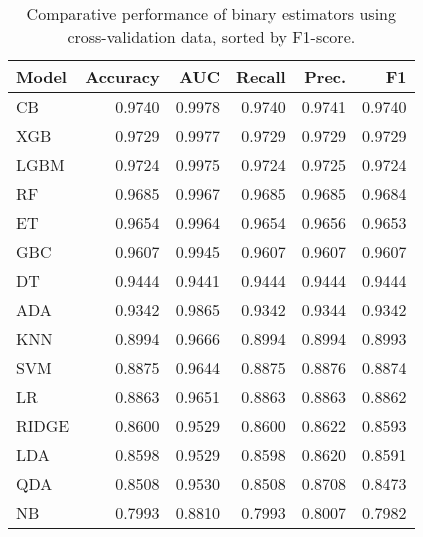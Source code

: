 \begin{table}
\caption{Comparative performance of binary estimators using cross-validation data, sorted by F1-score.}
\label{tbl:binary_cv_res_compare_models_df}
\begin{tabular}{lrrrrr}
\toprule
Model & Accuracy & AUC & Recall & Prec. & F1 \\
\midrule
CB & 0.9740 & 0.9978 & 0.9740 & 0.9741 & 0.9740 \\
XGB & 0.9729 & 0.9977 & 0.9729 & 0.9729 & 0.9729 \\
LGBM & 0.9724 & 0.9975 & 0.9724 & 0.9725 & 0.9724 \\
RF & 0.9685 & 0.9967 & 0.9685 & 0.9685 & 0.9684 \\
ET & 0.9654 & 0.9964 & 0.9654 & 0.9656 & 0.9653 \\
GBC & 0.9607 & 0.9945 & 0.9607 & 0.9607 & 0.9607 \\
DT & 0.9444 & 0.9441 & 0.9444 & 0.9444 & 0.9444 \\
ADA & 0.9342 & 0.9865 & 0.9342 & 0.9344 & 0.9342 \\
KNN & 0.8994 & 0.9666 & 0.8994 & 0.8994 & 0.8993 \\
SVM & 0.8875 & 0.9644 & 0.8875 & 0.8876 & 0.8874 \\
LR & 0.8863 & 0.9651 & 0.8863 & 0.8863 & 0.8862 \\
RIDGE & 0.8600 & 0.9529 & 0.8600 & 0.8622 & 0.8593 \\
LDA & 0.8598 & 0.9529 & 0.8598 & 0.8620 & 0.8591 \\
QDA & 0.8508 & 0.9530 & 0.8508 & 0.8708 & 0.8473 \\
NB & 0.7993 & 0.8810 & 0.7993 & 0.8007 & 0.7982 \\
\bottomrule
\end{tabular}
\end{table}
